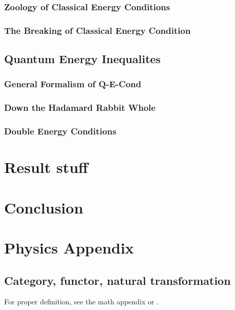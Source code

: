 \documentclass[a4paper,11pt]{article}
\numberwithin{equation}{section}
\theoremstyle{definition}
\begin{document}
\subsubsection{Zoology of Classical Energy Conditions}
\subsubsection{The Breaking of Classical Energy Condition}
\subsection{Quantum Energy Inequalites}
\subsubsection{General Formalism of Q-E-Cond}
\subsubsection{Down the Hadamard Rabbit Whole}
\subsubsection{Double Energy Conditions}
\section{Result stuff}


\section{Conclusion}
\newpage
\section{Physics Appendix}
    \subsection{Category, functor, natural transformation}
    For proper definition, see the math appendix or \cite{AlgLang}.
\end{document}
